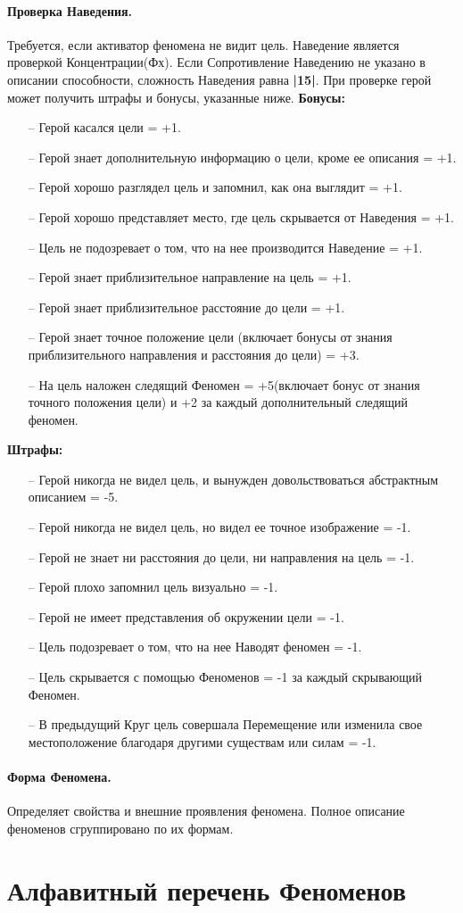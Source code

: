 \paragraph{Проверка Наведения.} Требуется, если активатор феномена не видит цель. Наведение является проверкой Концентрации(Фх). Если Сопротивление Наведению не указано в описании способности, сложность Наведения равна \textbf{|15|}. При проверке герой может получить штрафы и бонусы, указанные ниже.
\newline \textbf{Бонусы:}
\begin{itemize}
  \item[--] Герой касался цели = +1.
  \item[--] Герой знает дополнительную информацию о цели, кроме ее описания = +1.
  \item[--] Герой хорошо разглядел цель и запомнил, как она выглядит = +1.
  \item[--] Герой хорошо представляет место, где цель скрывается от Наведения = +1.
  \item[--] Цель не подозревает о том, что на нее производится Наведение = +1.
  \item[--] Герой знает приблизительное направление на цель = +1.
  \item[--] Герой знает приблизительное расстояние до цели = +1.
  \item[--] Герой знает точное положение цели (включает бонусы от знания приблизительного направления и расстояния до цели) = +3.
  \item[--] На цель наложен следящий Феномен = +5(включает бонус от знания точного положения цели) и +2 за каждый дополнительный следящий феномен.
\end{itemize}
\textbf{Штрафы:}
\begin{itemize}
  \item[--] Герой никогда не видел цель, и вынужден довольствоваться абстрактным описанием = -5.
  \item[--] Герой никогда не видел цель, но видел ее точное изображение = -1.
  \item[--] Герой не знает ни расстояния до цели, ни направления на цель = -1.
  \item[--] Герой плохо запомнил цель визуально = -1.
  \item[--] Герой не имеет представления об окружении цели = -1.
  \item[--] Цель подозревает о том, что на нее Наводят феномен = -1.
  \item[--] Цель скрывается с помощью Феноменов = -1 за каждый скрывающий Феномен.
  \item[--] В предыдущий Круг цель совершала Перемещение или изменила свое местоположение благодаря другими существам или силам = -1.
\end{itemize}

\paragraph{Форма Феномена.} Определяет свойства и внешние проявления феномена. Полное описание феноменов сгруппировано по их формам.


\section{Алфавитный перечень Феноменов}
\printindex[powers]
